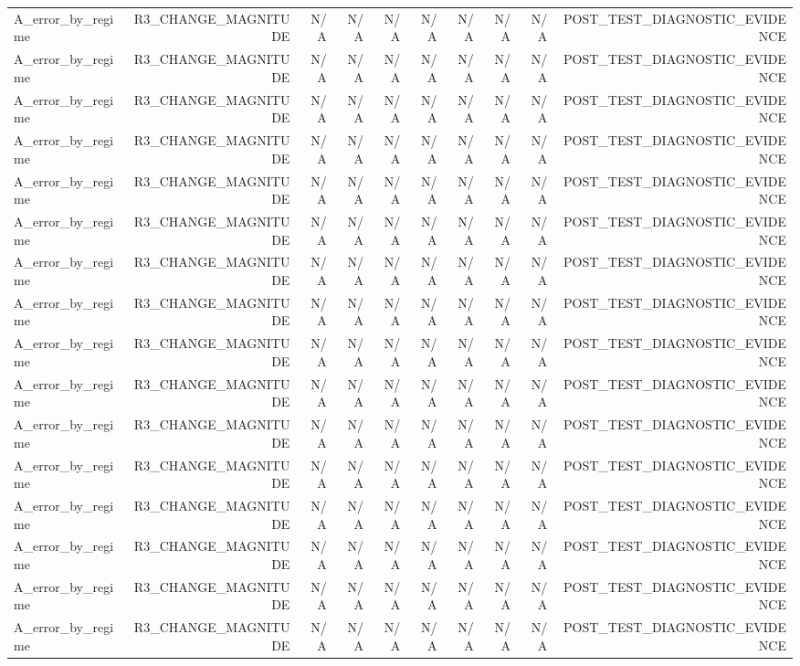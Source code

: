 \begin{table}[h!]
\begin{tabular}{lrrrrrrrrr}
A\_error\_by\_regime & R3\_CHANGE\_MAGNITUDE & N/A & N/A & N/A & N/A & N/A & N/A & N/A & POST\_TEST\_DIAGNOSTIC\_EVIDENCE \\
A\_error\_by\_regime & R3\_CHANGE\_MAGNITUDE & N/A & N/A & N/A & N/A & N/A & N/A & N/A & POST\_TEST\_DIAGNOSTIC\_EVIDENCE \\
A\_error\_by\_regime & R3\_CHANGE\_MAGNITUDE & N/A & N/A & N/A & N/A & N/A & N/A & N/A & POST\_TEST\_DIAGNOSTIC\_EVIDENCE \\
A\_error\_by\_regime & R3\_CHANGE\_MAGNITUDE & N/A & N/A & N/A & N/A & N/A & N/A & N/A & POST\_TEST\_DIAGNOSTIC\_EVIDENCE \\
A\_error\_by\_regime & R3\_CHANGE\_MAGNITUDE & N/A & N/A & N/A & N/A & N/A & N/A & N/A & POST\_TEST\_DIAGNOSTIC\_EVIDENCE \\
A\_error\_by\_regime & R3\_CHANGE\_MAGNITUDE & N/A & N/A & N/A & N/A & N/A & N/A & N/A & POST\_TEST\_DIAGNOSTIC\_EVIDENCE \\
A\_error\_by\_regime & R3\_CHANGE\_MAGNITUDE & N/A & N/A & N/A & N/A & N/A & N/A & N/A & POST\_TEST\_DIAGNOSTIC\_EVIDENCE \\
A\_error\_by\_regime & R3\_CHANGE\_MAGNITUDE & N/A & N/A & N/A & N/A & N/A & N/A & N/A & POST\_TEST\_DIAGNOSTIC\_EVIDENCE \\
A\_error\_by\_regime & R3\_CHANGE\_MAGNITUDE & N/A & N/A & N/A & N/A & N/A & N/A & N/A & POST\_TEST\_DIAGNOSTIC\_EVIDENCE \\
A\_error\_by\_regime & R3\_CHANGE\_MAGNITUDE & N/A & N/A & N/A & N/A & N/A & N/A & N/A & POST\_TEST\_DIAGNOSTIC\_EVIDENCE \\
A\_error\_by\_regime & R3\_CHANGE\_MAGNITUDE & N/A & N/A & N/A & N/A & N/A & N/A & N/A & POST\_TEST\_DIAGNOSTIC\_EVIDENCE \\
A\_error\_by\_regime & R3\_CHANGE\_MAGNITUDE & N/A & N/A & N/A & N/A & N/A & N/A & N/A & POST\_TEST\_DIAGNOSTIC\_EVIDENCE \\
A\_error\_by\_regime & R3\_CHANGE\_MAGNITUDE & N/A & N/A & N/A & N/A & N/A & N/A & N/A & POST\_TEST\_DIAGNOSTIC\_EVIDENCE \\
A\_error\_by\_regime & R3\_CHANGE\_MAGNITUDE & N/A & N/A & N/A & N/A & N/A & N/A & N/A & POST\_TEST\_DIAGNOSTIC\_EVIDENCE \\
A\_error\_by\_regime & R3\_CHANGE\_MAGNITUDE & N/A & N/A & N/A & N/A & N/A & N/A & N/A & POST\_TEST\_DIAGNOSTIC\_EVIDENCE \\
A\_error\_by\_regime & R3\_CHANGE\_MAGNITUDE & N/A & N/A & N/A & N/A & N/A & N/A & N/A & POST\_TEST\_DIAGNOSTIC\_EVIDENCE \\

\end{tabular}
\end{table}
